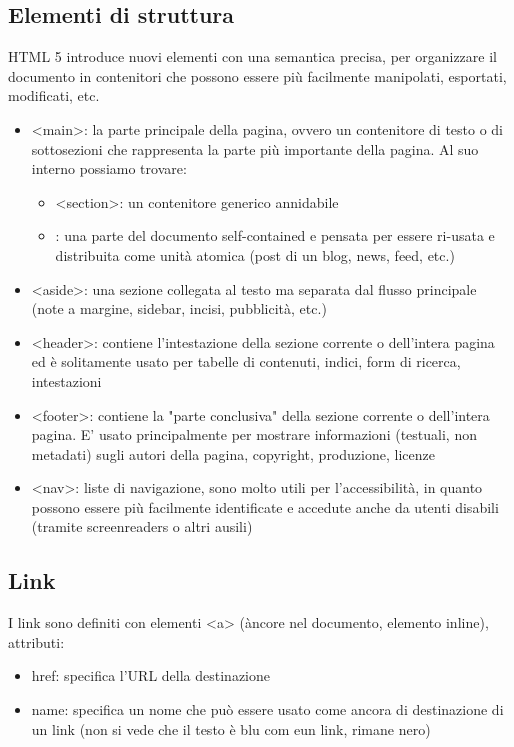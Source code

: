 \documentclass[a4paper,12pt]{article}
\begin{document}
\subsection*{Elementi di struttura}
HTML 5 introduce nuovi elementi con una semantica precisa, per organizzare il documento in contenitori che possono essere più facilmente manipolati, esportati, modificati, etc.
\begin{itemize}
  \item <main>: la parte principale della pagina, ovvero un contenitore di testo o di sottosezioni che rappresenta la parte più importante della pagina. Al suo interno possiamo trovare: 
  \begin{itemize}
    \item <section>: un contenitore generico annidabile
    \item <article>: una parte del documento self-contained e pensata per essere ri-usata e distribuita come unità atomica (post di un blog, news, feed, etc.)
  \end{itemize}
  \item <aside>: una sezione collegata al testo ma separata dal flusso principale (note a margine, sidebar, incisi, pubblicità, etc.)
  \item <header>: contiene l’intestazione della sezione corrente o dell’intera pagina ed è solitamente usato per tabelle di contenuti, indici, form di ricerca, intestazioni
  \item <footer>: contiene la "parte conclusiva" della sezione corrente o dell’intera pagina. E’ usato principalmente per mostrare informazioni (testuali, non metadati) sugli autori della pagina, copyright, produzione, licenze
  \item <nav>: liste di navigazione, sono molto utili per l’accessibilità, in quanto possono essere più facilmente identificate e accedute anche da utenti disabili (tramite screenreaders o altri ausili)
\end{itemize}
\subsection*{Link}
I link sono definiti con elementi <a> (àncore nel documento, elemento inline), attributi:
\begin{itemize}
  \item href: specifica l'URL della destinazione
  \item name: specifica un nome che può essere usato come ancora di destinazione di un link (non si vede che il testo è blu com eun link, rimane nero)
\end{itemize}
\end{document}
